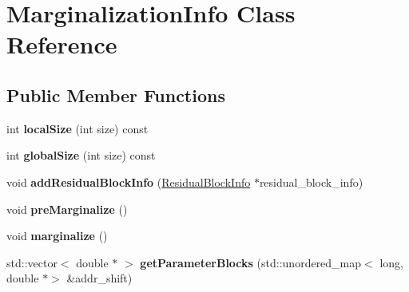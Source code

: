 \hypertarget{classMarginalizationInfo}{}\section{Marginalization\+Info Class Reference}
\label{classMarginalizationInfo}
\subsection*{Public Member Functions}
\begin{DoxyCompactItemize}
\item 
\mbox{\label{classMarginalizationInfo_a9ac410da5aefbe76286e4692d465431b}} 
int {\bfseries local\+Size} (int size) const
\item 
\mbox{\label{classMarginalizationInfo_ac611ec0c30087fa596936ecbf629e34d}} 
int {\bfseries global\+Size} (int size) const
\item 
\mbox{\label{classMarginalizationInfo_a5d682f628c8803f0e3969b7659edfa16}} 
void {\bfseries add\+Residual\+Block\+Info} (\hyperlink{structResidualBlockInfo}{Residual\+Block\+Info} $\ast$residual\+\_\+block\+\_\+info)
\item 
\mbox{\label{classMarginalizationInfo_a9c364f38dd5b6fcedf63dd3ebd5d2a55}} 
void {\bfseries pre\+Marginalize} ()
\item 
\mbox{\label{classMarginalizationInfo_a9d8e5484a4c3b655eec8381e318d37f9}} 
void {\bfseries marginalize} ()
\item 
\mbox{\label{classMarginalizationInfo_a9de8c94cc2b7ea87ffb7e86b758d03fe}} 
std\+::vector$<$ double $\ast$ $>$ {\bfseries get\+Parameter\+Blocks} (std\+::unordered\+\_\+map$<$ long, double $\ast$$>$ \&addr\+\_\+shift)
\end{DoxyCompactItemize}
